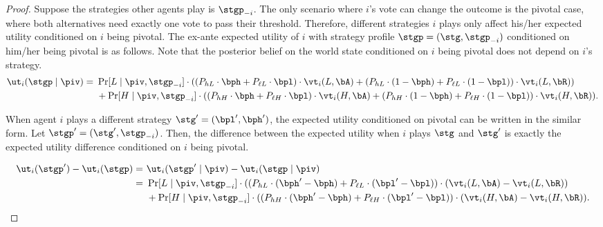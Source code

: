 \begin{proof}
    Suppose the strategies other agents play is $\stgp_{-i}$. The only scenario where $i$'s vote can change the outcome is the pivotal case, where both alternatives need exactly one vote to pass their threshold. Therefore, different strategies $i$ plays only affect his/her expected utility conditioned on $i$ being pivotal. The ex-ante expected utility of $i$ with strategy profile $\stgp = (\stg, \stgp_{-i})$ conditioned on him/her being pivotal is as follows. Note that the posterior belief on the world state conditioned on $i$ being pivotal does not depend on $i$'s strategy. 
    \begin{align*}
        \ut_{i}(\stgp \mid \piv) =&\ \Pr[L\mid \piv, \stgp_{-i}] \cdot ((P_{hL}\cdot \bph + P_{\ell L}\cdot \bpl)\cdot\vt_{i}(L, \bA) + (P_{hL}\cdot (1-\bph) + P_{\ell L}\cdot (1-\bpl))\cdot \vt_{i}(L, \bR)) \\
        &\ +  \Pr[H\mid \piv, \stgp_{-i}]\cdot ((P_{hH}\cdot \bph + P_{\ell H}\cdot \bpl)\cdot\vt_{i}(H, \bA) + (P_{hH}\cdot (1-\bph) + P_{\ell H}\cdot (1-\bpl))\cdot \vt_{i}(H, \bR)). 
    \end{align*}

    When agent $i$ plays a different strategy $\stg' = (\bpl', \bph')$, the expected utility conditioned on pivotal can be written in the similar form. Let $\stgp' = (\stg', \stgp_{-i})$. Then, the difference between the expected utility when $i$ plays $\stg$ and $\stg'$ is exactly the expected utility difference conditioned on $i$ being pivotal.

    \begin{align*}
        \ut_i(\stgp') - \ut_i(\stgp) = &\ \ut_i(\stgp' \mid \piv) - \ut_i(\stgp \mid \piv) \\
        =&\ \Pr[L \mid \piv, \stgp_{-i}] \cdot ((P_{hL} \cdot (\bph' - \bph) + P_{\ell L} \cdot (\bpl' - \bpl))\cdot (\vt_i(L, \bA) - \vt_i(L, \bR))\\
        &\ + \Pr[H \mid \piv, \stgp_{-i}] \cdot ((P_{hH} \cdot (\bph' - \bph) + P_{\ell H} \cdot (\bpl' - \bpl))\cdot (\vt_i(H, \bA) - \vt_i(H, \bR)). 
    \end{align*}



\end{proof}
